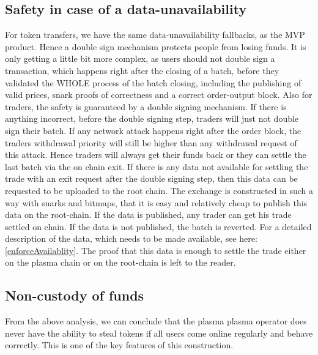 \documentclass[11pt,parskip=full]{scrartcl}%
\begin{document}
\subsection{Safety in case of a data-unavailability}
For token transfers, we have the same data-unavailability fallbacks, as the MVP product. 
Hence a double sign mechanism protects people from losing funds. 
It is only getting a little bit more complex, as users should not double sign a transaction, which happens right after the closing of a batch, before they validated the WHOLE process of the batch closing, including the publishing of valid prices, snark proofs of correctness and a correct order-output block. \newline
Also for traders, the safety is guaranteed by a  double signing mechanism. 
If there is anything incorrect, before the double signing step, traders will just not double sign their batch. 
If any network attack happens right after the order block, the traders withdrawal priority will still be higher than any withdrawal request of this attack. Hence traders will always get their funds back or they can settle the last batch via the on chain exit. 
If there is any data not available for settling the trade with an exit request after the double signing step, then this data can be requested to be uploaded to the root chain. 
The exchange is constructed in such a way with snarks and bitmaps, that it is easy and relatively cheap to publish this data on the root-chain. 
If the data is published, any trader can get his trade settled on chain. If the data is not published, the batch is reverted. 
For a detailed description of the data, which needs to be made available, see here: \ref{enforceAvailablity}. 
The proof that this data is enough to settle the trade either on the plasma chain or on the root-chain is left to the reader. 

\subsection{Non-custody of funds}
From the above analysis, we can conclude that the plasma plasma operator does never have the ability to steal tokens if all users come online regularly and behave correctly. 
This is one of the key features of this construction. 
\end{document}
